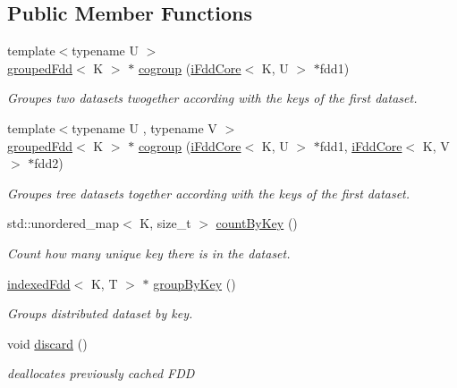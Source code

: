 \subsection*{Public Member Functions}
\begin{DoxyCompactItemize}
\item 
{\footnotesize template$<$typename U $>$ }\\\hyperlink{classfaster_1_1groupedFdd}{grouped\+Fdd}$<$ K $>$ $\ast$ \hyperlink{group__shuffle_ga311cd5a470392a25565057aaf0fa3226}{cogroup} (\hyperlink{classfaster_1_1iFddCore}{i\+Fdd\+Core}$<$ K, U $>$ $\ast$fdd1)
\begin{DoxyCompactList}\small\item\em Groupes two datasets twogether according with the keys of the first dataset. \end{DoxyCompactList}\item 
{\footnotesize template$<$typename U , typename V $>$ }\\\hyperlink{classfaster_1_1groupedFdd}{grouped\+Fdd}$<$ K $>$ $\ast$ \hyperlink{group__shuffle_gaf434c1c5118e380f9d78398fe46176d5}{cogroup} (\hyperlink{classfaster_1_1iFddCore}{i\+Fdd\+Core}$<$ K, U $>$ $\ast$fdd1, \hyperlink{classfaster_1_1iFddCore}{i\+Fdd\+Core}$<$ K, V $>$ $\ast$fdd2)
\begin{DoxyCompactList}\small\item\em Groupes tree datasets together according with the keys of the first dataset. \end{DoxyCompactList}\item 
std\+::unordered\+\_\+map$<$ K, size\+\_\+t $>$ \hyperlink{classfaster_1_1iFddCore_a4ed897a7b2af2918f91c3f8f89835ed4}{count\+By\+Key} ()
\begin{DoxyCompactList}\small\item\em Count how many unique key there is in the dataset. \end{DoxyCompactList}\item 
\hyperlink{classfaster_1_1indexedFdd}{indexed\+Fdd}$<$ K, T $>$ $\ast$ \hyperlink{group__shuffle_gac671d250f94c0927152362d4a982e931}{group\+By\+Key} ()
\begin{DoxyCompactList}\small\item\em Groups distributed dataset by key. \end{DoxyCompactList}\item 
void \hyperlink{group__memmodel_ga9a7002de9ec87e594aa461c1b379b453}{discard} ()
\begin{DoxyCompactList}\small\item\em deallocates previously cached F\+DD \end{DoxyCompactList}\item 

\end{DoxyCompactItemize}
